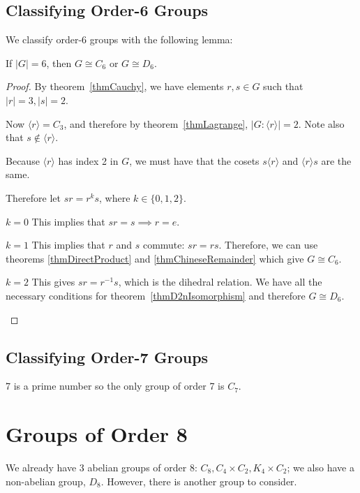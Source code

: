 \documentclass[../Main.tex]{subfiles}
\begin{document}
\subsection{Classifying Order-6 Groups}
We classify order-6 groups with the following lemma:
\begin{lemma}
    If $|G| = 6$, then $G \cong C_6$ or $G \cong D_6$.
\end{lemma}
\begin{proof}
    By theorem~\ref{thmCauchy}, we have elements $r, s \in G$ such that $|r| = 3, |s| = 2$.\par
    Now $\langle r \rangle = C_3$, and therefore by theorem~\ref{thmLagrange}, $|G : \langle r \rangle| = 2$. Note also that $s \notin \langle r \rangle$.\par
    Because $\langle r \rangle$ has index 2 in $G$, we must have that the cosets $s \langle r \rangle$ and $\langle r \rangle s$ are the same.\par
    Therefore let $sr = r^k s$, where $k \in \{0, 1, 2\}$.
    \begin{case}{$k = 0$}
        This implies that $sr = s \implies r = e$. \contradiction
    \end{case}
    \begin{case}{$k = 1$}
        This implies that $r$ and $s$ commute: $sr = rs$. Therefore, we can use theorems \ref{thmDirectProduct} and \ref{thmChineseRemainder} which give $G \cong C_6$.
    \end{case}
    \begin{case}{$k = 2$}
        This gives $sr = r^{-1} s$, which is the dihedral relation. We have all the necessary conditions for theorem~\ref{thmD2nIsomorphism} and therefore $G \cong D_6$.
    \end{case}
\end{proof}
\subsection{Classifying Order-7 Groups}
7 is a prime number so the only group of order 7 is $C_7$.
\section{Groups of Order 8}
We already have 3 abelian groups of order 8: $C_8, C_4 \times C_2, K_4 \times C_2$; we also have a non-abelian group, $D_8$. However, there is another group to consider.
\end{document}
